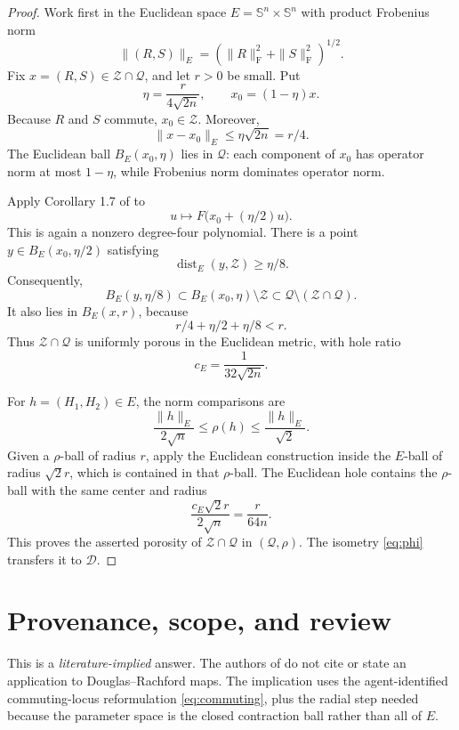 \documentclass[11pt]{article}
\newcommand{\Sym}{\mathbb S^n}
\newcommand{\Frob}{\mathrm F}
\newcommand{\Dset}{\mathcal D}
\newcommand{\Qset}{\mathcal Q}
\newcommand{\Zset}{\mathcal Z}
\begin{document}
\begin{proof}
Work first in the Euclidean space
$E=\Sym\times\Sym$ with product Frobenius norm
\[
 \|(R,S)\|_E=(\|R\|_{\Frob}^2+\|S\|_{\Frob}^2)^{1/2}.
\]
Fix $x=(R,S)\in\Zset\cap\Qset$, and let $r>0$ be small.  Put
\[
 \eta=\frac{r}{4\sqrt{2n}},\qquad x_0=(1-\eta)x.
\]
Because $R$ and $S$ commute, $x_0\in\Zset$.  Moreover,
\[
 \|x-x_0\|_E\le\eta\sqrt{2n}=r/4.
\]
The Euclidean ball $B_E(x_0,\eta)$ lies in $\Qset$: each component of
$x_0$ has operator norm at most $1-\eta$, while Frobenius norm dominates
operator norm.

Apply Corollary 1.7 of \cite{GKP} to
\[
 u\longmapsto F\bigl(x_0+(\eta/2)u\bigr).
\]
This is again a nonzero degree-four polynomial.  There is a point
$y\in B_E(x_0,\eta/2)$ satisfying
\[
 \operatorname{dist}_E(y,\Zset)\ge\eta/8.
\]
Consequently,
\[
 B_E(y,\eta/8)
 \subset B_E(x_0,\eta)\setminus\Zset
 \subset\Qset\setminus(\Zset\cap\Qset).
\]
It also lies in $B_E(x,r)$, because
\[
 r/4+\eta/2+\eta/8<r.
\]
Thus $\Zset\cap\Qset$ is uniformly porous in the Euclidean metric, with
hole ratio
\begin{equation}\label{eq:e-constant}
 c_E=\frac{1}{32\sqrt{2n}}.
\end{equation}

For $h=(H_1,H_2)\in E$, the norm comparisons are
\begin{equation}\label{eq:norms}
 \frac{\|h\|_E}{2\sqrt n}
 \le \rho(h)
 \le \frac{\|h\|_E}{\sqrt2}.
\end{equation}
Given a $\rho$-ball of radius $r$, apply the Euclidean construction inside
the $E$-ball of radius $\sqrt2r$, which is contained in that $\rho$-ball.
The Euclidean hole contains the $\rho$-ball with the same center and radius
\[
 \frac{c_E\sqrt2r}{2\sqrt n}=\frac{r}{64n}.
\]
This proves the asserted porosity of $\Zset\cap\Qset$ in $(\Qset,\rho)$.
The isometry \eqref{eq:phi} transfers it to $\Dset$.
\end{proof}

\section{Provenance, scope, and review}

This is a \emph{literature-implied} answer.  The authors of \cite{GKP} do
not cite \cite{BSW} or state an application to Douglas--Rachford maps.  The
implication uses the agent-identified commuting-locus reformulation
\eqref{eq:commuting}, plus the radial step needed because the parameter space
is the closed contraction ball rather than all of $E$.
\end{document}
